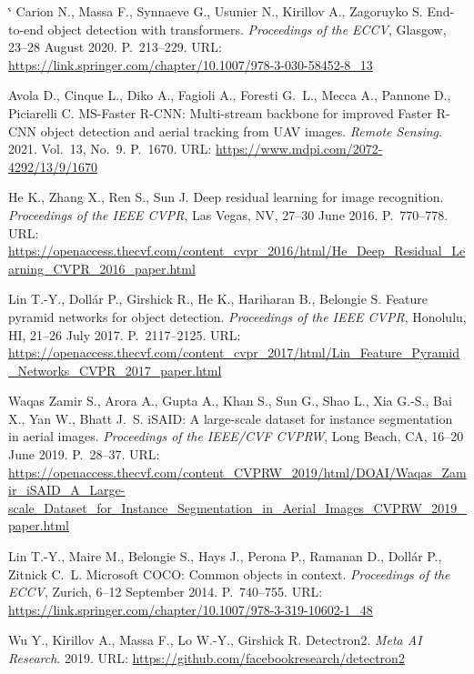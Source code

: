 \documentclass[14pt,a4paper]{extreport}
\makeatletter
\renewcommand\@biblabel[1]{#1.}
\renewenvironment{thebibliography}[1]{%
  \list{\@biblabel{\@arabic\c@enumiv}}{%
    \settowidth\labelwidth{\@biblabel{#1}}%
    \leftmargin\labelwidth
    \advance\leftmargin\labelsep
    \usecounter{enumiv}%
    \let\p@enumiv\@empty
    \renewcommand\theenumiv{\@arabic\c@enumiv}}%
  \sloppy\clubpenalty4000\widowpenalty4000\sfcode`\.\@m}
  {\def\@noitemerr{\@latex@warning{Empty `thebibliography' environment}}\endlist}
\makeatother
\begin{document}
\begin{thebibliography}{15}
Carion N., Massa F., Synnaeve G., Usunier N., Kirillov A., Zagoruyko S.
End-to-end object detection with transformers.
\textit{Proceedings of the ECCV}, Glasgow, 23--28 August 2020.
P.~213--229.
URL: \url{https://link.springer.com/chapter/10.1007/978-3-030-58452-8_13}

Avola D., Cinque L., Diko A., Fagioli A., Foresti G.~L., Mecca A.,
Pannone D., Piciarelli C. MS-Faster R-CNN: Multi-stream backbone for
improved Faster R-CNN object detection and aerial tracking from UAV
images. \textit{Remote Sensing}. 2021. Vol.~13, No.~9. P.~1670.
URL: \url{https://www.mdpi.com/2072-4292/13/9/1670}

He K., Zhang X., Ren S., Sun J. Deep residual learning for image
recognition.
\textit{Proceedings of the IEEE CVPR}, Las Vegas, NV, 27--30 June 2016.
P.~770--778.
URL: \url{https://openaccess.thecvf.com/content_cvpr_2016/html/He_Deep_Residual_Learning_CVPR_2016_paper.html}

Lin T.-Y., Dollár P., Girshick R., He K., Hariharan B., Belongie S.
Feature pyramid networks for object detection.
\textit{Proceedings of the IEEE CVPR}, Honolulu, HI, 21--26 July 2017.
P.~2117--2125.
URL: \url{https://openaccess.thecvf.com/content_cvpr_2017/html/Lin_Feature_Pyramid_Networks_CVPR_2017_paper.html}

Waqas Zamir S., Arora A., Gupta A., Khan S., Sun G., Shao L., Xia G.-S.,
Bai X., Yan W., Bhatt J.~S. iSAID: A large-scale dataset for instance
segmentation in aerial images.
\textit{Proceedings of the IEEE/CVF CVPRW}, Long Beach, CA, 16--20 June
2019. P.~28--37.
URL: \url{https://openaccess.thecvf.com/content_CVPRW_2019/html/DOAI/Waqas_Zamir_iSAID_A_Large-scale_Dataset_for_Instance_Segmentation_in_Aerial_Images_CVPRW_2019_paper.html}

Lin T.-Y., Maire M., Belongie S., Hays J., Perona P., Ramanan D.,
Dollár P., Zitnick C.~L. Microsoft COCO: Common objects in context.
\textit{Proceedings of the ECCV}, Zurich, 6--12 September 2014.
P.~740--755.
URL: \url{https://link.springer.com/chapter/10.1007/978-3-319-10602-1_48}

Wu Y., Kirillov A., Massa F., Lo W.-Y., Girshick R. Detectron2.
\textit{Meta AI Research}. 2019.
URL: \url{https://github.com/facebookresearch/detectron2}

\end{thebibliography}

\end{document}
